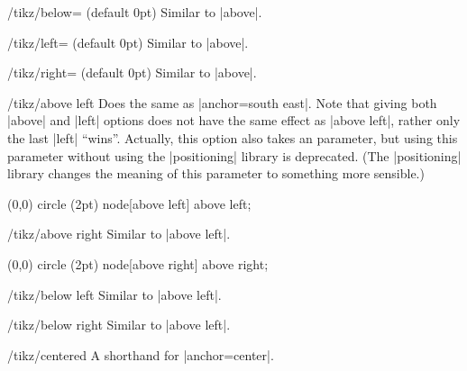 \begin{key}{/tikz/below= (default 0pt)}
    Similar to |above|.
\end{key}

\begin{key}{/tikz/left= (default 0pt)}
    Similar to |above|.
\end{key}

\begin{key}{/tikz/right= (default 0pt)}
    Similar to |above|.
\end{key}

\begin{key}{/tikz/above left}
    Does the same as |anchor=south east|. Note that giving both |above| and
    |left| options does not have the same effect as |above left|, rather only
    the last |left| ``wins''. Actually, this option also takes an 
    parameter, but using this parameter without using the |positioning| library
    is deprecated. (The |positioning| library changes the meaning of this
    parameter to something more sensible.)
\begin{codeexample}[]
\tikz \fill (0,0) circle (2pt) node[above left] {above left};
\end{codeexample}
\end{key}

\begin{key}{/tikz/above right}
    Similar to  |above left|.
\begin{codeexample}[]
\tikz \fill (0,0) circle (2pt) node[above right] {above right};
\end{codeexample}
\end{key}

\begin{key}{/tikz/below left}
    Similar to |above left|.
\end{key}

\begin{key}{/tikz/below right}
    Similar to |above left|.
\end{key}

\begin{key}{/tikz/centered}
    A shorthand for |anchor=center|.
\end{key}

